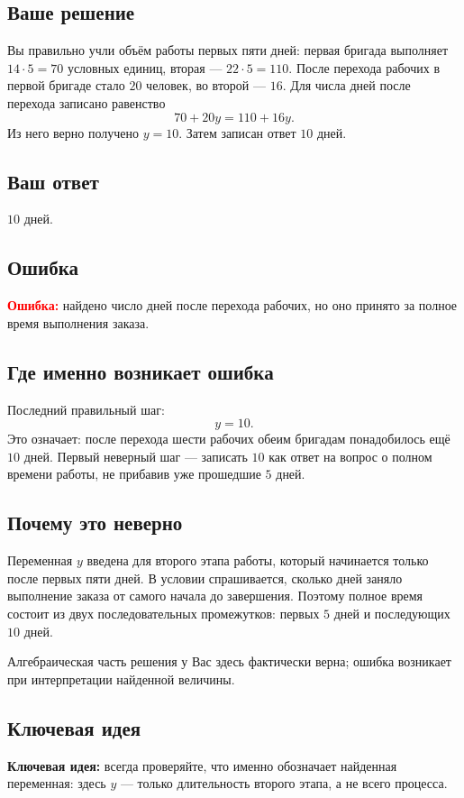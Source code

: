 \documentclass[12pt,a4paper]{article}
\newcommand{\err}{\textcolor{red}{\textbf{Ошибка:}}}
\newcommand{\idea}{\textcolor{blue!60!black}{\textbf{Ключевая идея:}}}
\begin{document}
\subsection*{Ваше решение}
Вы правильно учли объём работы первых пяти дней: первая бригада выполняет $14\cdot5=70$ условных единиц, вторая --- $22\cdot5=110$. После перехода рабочих в первой бригаде стало $20$ человек, во второй --- $16$. Для числа дней после перехода записано равенство
\[
70+20y=110+16y.
\]
Из него верно получено $y=10$. Затем записан ответ $10$ дней.

\subsection*{Ваш ответ}
$10$ дней.

\subsection*{Ошибка}
\err{} найдено число дней после перехода рабочих, но оно принято за полное время выполнения заказа.

\subsection*{Где именно возникает ошибка}
Последний правильный шаг:
\[
y=10.
\]
Это означает: после перехода шести рабочих обеим бригадам понадобилось ещё $10$ дней. Первый неверный шаг --- записать $10$ как ответ на вопрос о полном времени работы, не прибавив уже прошедшие $5$ дней.

\subsection*{Почему это неверно}
Переменная $y$ введена для второго этапа работы, который начинается только после первых пяти дней. В условии спрашивается, сколько дней заняло выполнение заказа от самого начала до завершения. Поэтому полное время состоит из двух последовательных промежутков: первых $5$ дней и последующих $10$ дней.

Алгебраическая часть решения у Вас здесь фактически верна; ошибка возникает при интерпретации найденной величины.

\subsection*{Ключевая идея}
\idea{} всегда проверяйте, что именно обозначает найденная переменная: здесь $y$ --- только длительность второго этапа, а не всего процесса.
\end{document}
